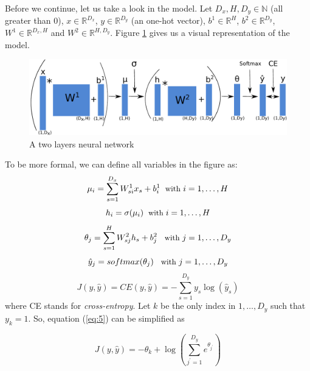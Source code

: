 \documentclass{article}
\begin{document}
\vspace{0.5cm}

Before we continue, let us take a look in the model. Let $D_x,H,D_y \in  \mathbb{N}$ (all greater than $0$), $x \in \mathbb{R}^{D_x}$, $y \in \mathbb{R}^{D_y}$ (an one-hot vector), $b^{1} \in \mathbb{R}^{H}$, $b^{2} \in \mathbb{R}^{D_{y}}$, $W^{1} \in \mathbb{R}^{D_x,H}$ and $W^{2} \in \mathbb{R}^{H,D_y}$. Figure \ref{neural} gives us a visual representation of the model. 

\begin{figure}
\begin{center}
\includegraphics[scale=0.85]{neural.pdf}
\end{center}
\caption{A two layers neural network}
\label{neural}
\end{figure}
To be more formal, we can define all variables in the figure as:
 \begin{equation}\label{eq:1}
\mu_i = \sum_{s=1}^{D_{x}}W^{1}_{si} x_{s} + b^{1}_{i}  \; {\small \text{ with }i = 1, \dots, H}
\end{equation}
\begin{equation}\label{eq:2}
h_i = \sigma(\mu_i)  \; {\small \text{ with }i = 1, \dots, H}
\end{equation}
\begin{equation}\label{eq:3}
\theta_j = \sum_{s=1}^{H}W^{2}_{sj} h_{s} + b^{2}_{j} \;\; {\small \text{ with }j = 1, \dots, D_{y}}
\end{equation}
\begin{equation}\label{eq:4}
\hat{y}_j = softmax(\theta_j) \;\; {\small \text{ with }j = 1, \dots, D_{y}}
\end{equation}
\begin{equation}\label{eq:5}
J(y,\hat{y}) = CE(y,\hat{y}) = -\sum_{s=1}^{D_{y}} y_s  \log(\hat{y}_s)
\end{equation}
where CE stands for \textit{cross-entropy}. Let $k$ be the only index in ${1,\dots,D_{y}}$ such that $y_k =1$. So, equation (\ref{eq:5}) can be simplified as 

\begin{equation}\label{eq:6}
J(y,\hat{y}) = - \theta_k + \log(\sum_{j^{\prime}=1}^{D_{y}} e^{\theta_{j^{\prime}}})
\end{equation}
\end{document}

